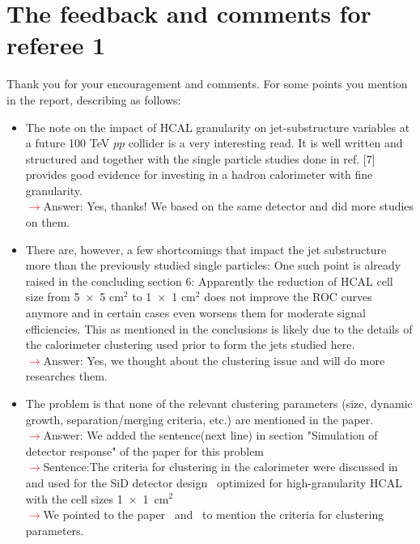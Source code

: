 \documentclass[final,1p,11pt]{elsarticle}
\begin{document}
\section{The feedback and comments for referee 1}
Thank you for your encouragement and comments. For some points you mention in the report, describing as follows:\\
\begin{itemize}
\item The note on the impact of HCAL granularity on jet-substructure variables at a future 100 TeV $pp$ collider is a very interesting read. It is well written and structured and together with the single particle studies done in ref. [7] provides good evidence for investing in a hadron calorimeter with fine granularity.\\
\textcolor{red}{$\rightarrow$}Answer: Yes, thanks! We based on the same detector and did more studies on them.
\item There are, however, a few shortcomings that impact the jet substructure more than the previously studied single particles: One such point is already raised in the concluding section 6: Apparently the reduction of HCAL cell size from 5~$\times$~5 cm$^2$ to 1~$\times$~1 cm$^2$ does not improve the ROC curves anymore and in certain cases even worsens them for moderate signal efficiencies. This as mentioned in the conclusions is likely due to the details of the calorimeter clustering used prior to form the jets studied here.\\
 \textcolor{red}{$\rightarrow$}Answer: Yes, we thought about the clustering issue and will do more researches them.
\item The problem is that none of the relevant clustering parameters (size, dynamic growth, separation/merging criteria, etc.) are mentioned in the paper.\\
 \textcolor{red}{$\rightarrow$}Answer: We added the sentence(next line) in section "Simulation of detector response" of the paper for this problem\\ 
 \textcolor{red}{$\rightarrow$}Sentence:The criteria for clustering in the calorimeter were discussed in~\cite{THOMSON200925} and used for the SiD detector design~\cite{Behnke:2013lya} optimized for high-granularity HCAL with the cell sizes 1~$\times$~1~cm$^2$\\
 \textcolor{red}{$\rightarrow$}We pointed to the paper~\cite{THOMSON200925} and~\cite{Behnke:2013lya} to mention the criteria for clustering parameters.

\end{itemize}
\end{document}
